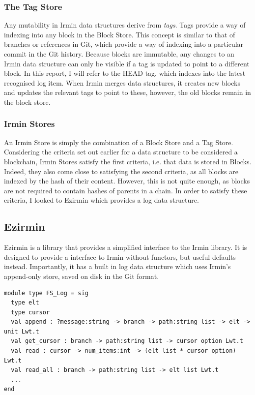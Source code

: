 \documentclass[12pt,a4paper,twoside,openright]{report}
\begin{document}
	\subsubsection*{The Tag Store}
	Any mutability in Irmin data structures derive from \textit{tags}.
	Tags provide a way of indexing into any block in the Block Store.
	This concept is similar to that of branches or references in Git, which provide a way of indexing into a particular commit in the Git history.
	Because blocks are immutable, any changes to an Irmin data structure can only be visible if a tag is updated to point to a different block. 
	In this report, I will refer to the HEAD tag, which indexes into the latest recognised log item.
	When Irmin merges data structures, it creates new blocks and updates the relevant tags to point to these, however, the old blocks remain in the block store.
	\subsubsection*{Irmin Stores}
	An Irmin Store is simply the combination of a Block Store and a Tag Store.
	Considering the criteria set out earlier for a data structure to be considered a blockchain, Irmin Stores satisfy the first criteria, i.e. that data is stored in Blocks.
	Indeed, they also come close to satisfying the second criteria, as all blocks are indexed by the hash of their content. 
	However, this is not quite enough, as blocks are not required to contain hashes of parents in a chain.
	In order to satisfy these criteria, I looked to Ezirmin which provides a log data structure.

	\subsection{Ezirmin}
	Ezirmin is a library that provides a simplified interface to the Irmin library. 
	It is designed to provide a interface to Irmin without functors, but useful defaults instead. 
	Importantly, it has a built in log data structure which uses Irmin's append-only store, saved on disk in the Git format.

	\begin{lstlisting}[caption={Ezirmin Log},label={lst:ezirminlog}]
module type FS_Log = sig
  type elt 
  type cursor 
  val append : ?message:string -> branch -> path:string list -> elt -> unit Lwt.t
  val get_cursor : branch -> path:string list -> cursor option Lwt.t
  val read : cursor -> num_items:int -> (elt list * cursor option) Lwt.t
  val read_all : branch -> path:string list -> elt list Lwt.t
  ...
end
	\end{lstlisting}
\end{document}
